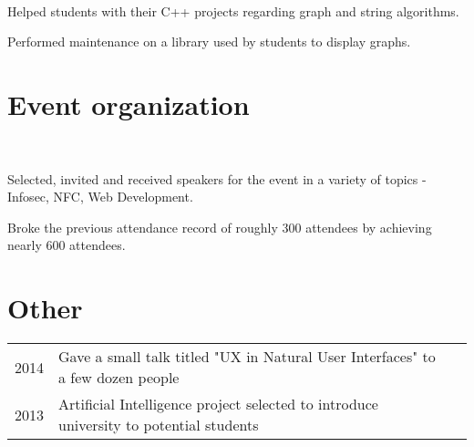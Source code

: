 \documentclass[letterpaper]{deedy-resume} %
\begin{document}
\begin{minipage}[t]{0.66\textwidth}
\sectionspace %


 \\

\begin{tightitemize}
\item Helped students with their C++ projects regarding graph and string algorithms.
\item Performed maintenance on a library used by students to display graphs.
\end{tightitemize}

\sectionspace %


\section{Event organization}

 \\

\begin{tightitemize}
\item Selected, invited and received speakers for the event in a variety of topics - Infosec, NFC, Web Development.
\item Broke the previous attendance record of roughly 300 attendees by achieving nearly 600 attendees.
\end{tightitemize}

\sectionspace %


\section{Other}

\begin{tabular}{rll}
2014 & Gave a small talk titled "UX in Natural User Interfaces" to a few dozen people \\
2013 & Artificial Intelligence project selected to introduce university to potential students
\end{tabular}

\sectionspace %

\end{minipage} %
\end{document}
